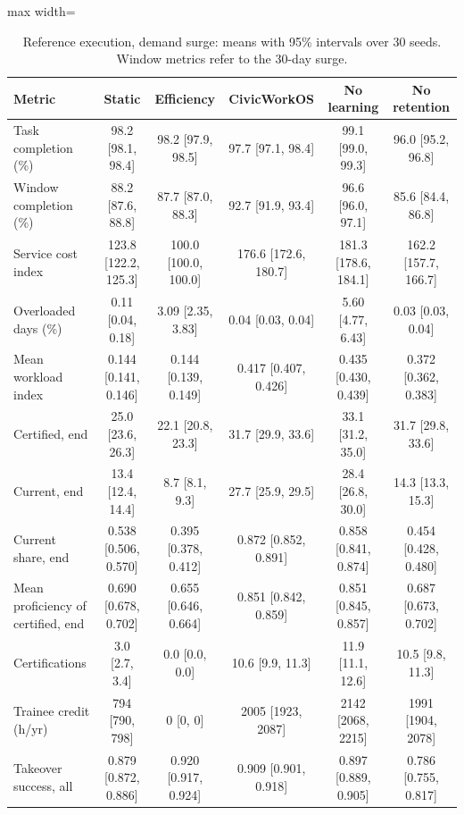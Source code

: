 \documentclass[utf8]{frontiers_suppmat}
\begin{document}
\begin{table}[!htbp]
	\caption{Reference execution, demand surge: means with 95\% intervals over 30 seeds. Window metrics refer to the 30-day surge.}
	\label{tab:ext-surge}
	\scriptsize
	\setlength{\tabcolsep}{2pt}
	\begin{adjustbox}{max width=\textwidth}
	\begin{tabular}{@{}lccccc@{}}
		\toprule
		\textbf{Metric} & \textbf{Static} & \textbf{Efficiency} & \textbf{CivicWorkOS} & \textbf{No learning} & \textbf{No retention}\\
		\midrule
Task completion (\%) & 98.2 [98.1, 98.4] & 98.2 [97.9, 98.5] & 97.7 [97.1, 98.4] & 99.1 [99.0, 99.3] & 96.0 [95.2, 96.8]\\
Window completion (\%) & 88.2 [87.6, 88.8] & 87.7 [87.0, 88.3] & 92.7 [91.9, 93.4] & 96.6 [96.0, 97.1] & 85.6 [84.4, 86.8]\\
Service cost index & 123.8 [122.2, 125.3] & 100.0 [100.0, 100.0] & 176.6 [172.6, 180.7] & 181.3 [178.6, 184.1] & 162.2 [157.7, 166.7]\\
Overloaded days (\%) & 0.11 [0.04, 0.18] & 3.09 [2.35, 3.83] & 0.04 [0.03, 0.04] & 5.60 [4.77, 6.43] & 0.03 [0.03, 0.04]\\
Mean workload index & 0.144 [0.141, 0.146] & 0.144 [0.139, 0.149] & 0.417 [0.407, 0.426] & 0.435 [0.430, 0.439] & 0.372 [0.362, 0.383]\\
Certified, end & 25.0 [23.6, 26.3] & 22.1 [20.8, 23.3] & 31.7 [29.9, 33.6] & 33.1 [31.2, 35.0] & 31.7 [29.8, 33.6]\\
Current, end & 13.4 [12.4, 14.4] & 8.7 [8.1, 9.3] & 27.7 [25.9, 29.5] & 28.4 [26.8, 30.0] & 14.3 [13.3, 15.3]\\
Current share, end & 0.538 [0.506, 0.570] & 0.395 [0.378, 0.412] & 0.872 [0.852, 0.891] & 0.858 [0.841, 0.874] & 0.454 [0.428, 0.480]\\
Mean proficiency of certified, end & 0.690 [0.678, 0.702] & 0.655 [0.646, 0.664] & 0.851 [0.842, 0.859] & 0.851 [0.845, 0.857] & 0.687 [0.673, 0.702]\\
Certifications & 3.0 [2.7, 3.4] & 0.0 [0.0, 0.0] & 10.6 [9.9, 11.3] & 11.9 [11.1, 12.6] & 10.5 [9.8, 11.3]\\
Trainee credit (h/yr) & 794 [790, 798] & 0 [0, 0] & 2005 [1923, 2087] & 2142 [2068, 2215] & 1991 [1904, 2078]\\
Takeover success, all & 0.879 [0.872, 0.886] & 0.920 [0.917, 0.924] & 0.909 [0.901, 0.918] & 0.897 [0.889, 0.905] & 0.786 [0.755, 0.817]\\

\end{tabular}
\end{adjustbox}
\end{table}
\end{document}
